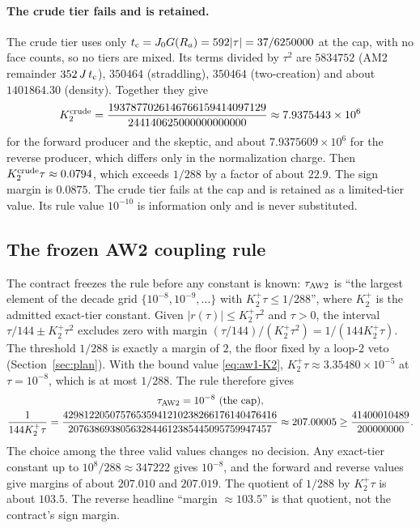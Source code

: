 \paragraph{The crude tier fails and is retained.}
The crude tier uses only $t_{\rm c}=J_0G(R_a)=592|\tau|=37/6250000$ at the
cap, with no face counts, so no tiers are mixed. Its terms divided by
$\tau^2$ are $5834752$ (AM2 remainder $352\,J\,t_{\rm c}$), $350464$
(straddling), $350464$ (two-creation) and about $1401864.30$ (density).
Together they give
\begin{equation}
 K_2^{\rm crude}=\frac{1937877026146766159414097129}{244140625000000000000}
 \approx7.9375443\times10^{6}
 \label{eq:aw1-K2crude}
\end{equation}
for the forward producer and the skeptic, and about $7.9375609\times10^6$ for
the reverse producer, which differs only in the normalization charge. Then
$K_2^{\rm crude}\tau\approx0.0794$, which exceeds $1/288$ by a factor of about
$22.9$. The sign margin is $0.0875$. The crude tier fails at the cap and is
retained as a limited-tier value. Its rule value $10^{-10}$ is information
only and is never substituted.

\subsection{The frozen AW2 coupling rule}
\label{sec:aw1-rule}
The contract freezes the rule before any constant is known: $\tau_{\rm AW2}$
is ``the largest element of the decade grid $\{10^{-8},10^{-9},\ldots\}$ with
$K_2^+\tau\le1/288$'', where $K_2^+$ is the admitted exact-tier constant.
Given $|r(\tau)|\le K_2^+\tau^2$ and $\tau>0$, the interval
$\tau/144\pm K_2^+\tau^2$ excludes zero with margin
$(\tau/144)/(K_2^+\tau^2)=1/(144K_2^+\tau)$. The threshold $1/288$ is exactly
a margin of $2$, the floor fixed by a loop-2 veto (Section~\ref{sec:plan}).
With the bound value \eqref{eq:aw1-K2}, $K_2^+\tau\approx3.35480\times10^{-5}$
at $\tau=10^{-8}$, which is at most $1/288$. The rule therefore gives
\begin{equation}
 \begin{gathered}
 \tau_{\rm AW2}=10^{-8}\ (\text{the cap}),\\
 \frac{1}{144K_2^+\tau}
 =\frac{42981220507576535941210238266176140476416}{207638693805632844612385445095759947457}
 \approx207.00005\ge\frac{41400010489}{200000000}.
 \end{gathered}
 \label{eq:aw1-rule}
\end{equation}
The choice among the three valid values changes no decision. Any exact-tier
constant up to $10^8/288\approx347222$ gives $10^{-8}$, and the forward and
reverse values give margins of about $207.010$ and $207.019$. The quotient of
$1/288$ by $K_2^+\tau$ is about $103.5$. The reverse headline ``margin
$\approx103.5$'' is that quotient, not the contract's sign margin.

